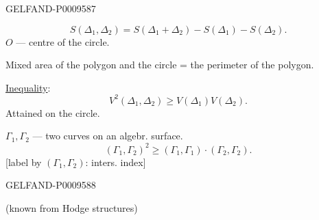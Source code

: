 \begin{GelfandAdjacentEvidence}{GELFAND-P000958}{7}

\begin{equation*}
 S(\Delta_1,\Delta_2)=S(\Delta_1+\Delta_2)-S(\Delta_1)-S(\Delta_2).
 \tag{17}
\end{equation*}
$O$ --- centre of the circle.

Mixed area of the polygon and the circle = the perimeter of the polygon.

\underline{Inequality}:
\begin{equation*}
 V^2(\Delta_1,\Delta_2)\geqslant V(\Delta_1)V(\Delta_2).
 \tag{18}
\end{equation*}
Attained on the circle.


$\Gamma_1,\Gamma_2$ --- two curves on an algebr. surface.
\begin{equation*}
 (\Gamma_1,\Gamma_2)^2\geqslant(\Gamma_1,\Gamma_1)\cdot(\Gamma_2,\Gamma_2).
 \tag{19}
\end{equation*}
[label by $(\Gamma_1,\Gamma_2)$: inters. index]
\end{GelfandAdjacentEvidence}
\begin{GelfandAdjacentEvidence}{GELFAND-P000958}{8}


(known from Hodge structures)
\end{GelfandAdjacentEvidence}


